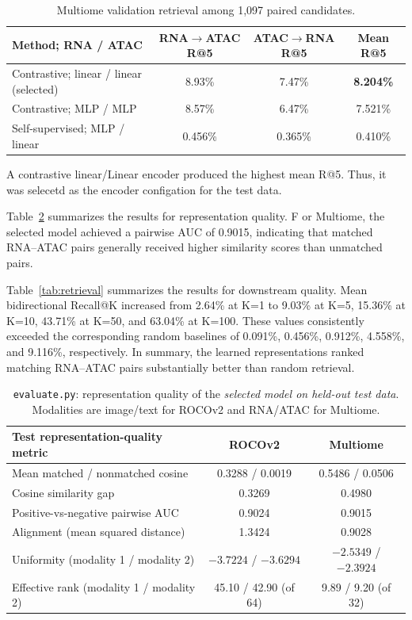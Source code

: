 \documentclass[10pt]{article}
\begin{document}
\begin{table}[H]
\centering\small\setlength{\tabcolsep}{7pt}
\begin{tabular}{lccc}
\toprule
\textbf{Method; RNA / ATAC} & \textbf{RNA$\to$ATAC R@5} & \textbf{ATAC$\to$RNA R@5} & \textbf{Mean R@5}\\\midrule
Contrastive; linear / linear (selected) & 8.93\% & 7.47\% & \textbf{8.204\%}\\
Contrastive; MLP / MLP & 8.57\% & 6.47\% & 7.521\%\\
Self-supervised; MLP / linear & 0.456\% & 0.365\% & 0.410\%\\\bottomrule
\end{tabular}
\caption{Multiome validation retrieval among 1,097 paired candidates.}
\label{tab:multiome}
\end{table}

A contrastive linear/Linear encoder produced the highest mean R@5. 
Thus, it was selecetd as the encoder configation for the test data. 

Table~\ref{tab:test-summary} summarizes the results for representation quality. F
or Multiome, the selected model achieved a pairwise AUC of 0.9015, 
indicating that matched RNA--ATAC pairs generally received higher similarity 
scores than unmatched pairs.

Table~\ref{tab:retrieval} summarizes the results for downstream quality. 
Mean bidirectional Recall@K increased from 2.64\% at K=1 to 9.03\% at K=5, 
15.36\% at K=10, 43.71\% at K=50, and 63.04\% at K=100. 
These values consistently exceeded the corresponding random baselines 
of 0.091\%, 0.456\%, 0.912\%, 4.558\%, and 9.116\%, respectively. In summary, 
the learned representations ranked matching RNA--ATAC pairs substantially better 
than random retrieval.

\begin{table}[H]
\centering\small\setlength{\tabcolsep}{5pt}
\begin{tabular}{lcc}
\toprule
\textbf{Test representation-quality metric} & \textbf{ROCOv2} & \textbf{Multiome}\\\midrule
Mean matched / nonmatched cosine & 0.3288 / 0.0019 & 0.5486 / 0.0506\\
Cosine similarity gap & 0.3269 & 0.4980\\
Positive-vs-negative pairwise AUC & 0.9024 & 0.9015\\
Alignment (mean squared distance) & 1.3424 & 0.9028\\
Uniformity (modality 1 / modality 2) & $-3.7224$ / $-3.6294$ & $-2.5349$ / $-2.3924$\\
Effective rank (modality 1 / modality 2) & 45.10 / 42.90 (of 64) & 9.89 / 9.20 (of 32)\\
\bottomrule
\end{tabular}
\caption{\texttt{evaluate.py}: representation quality of the \emph{selected model on held-out test data}. Modalities are image/text for ROCOv2 and RNA/ATAC for Multiome.}
\label{tab:test-summary}
\end{table}
\end{document}
